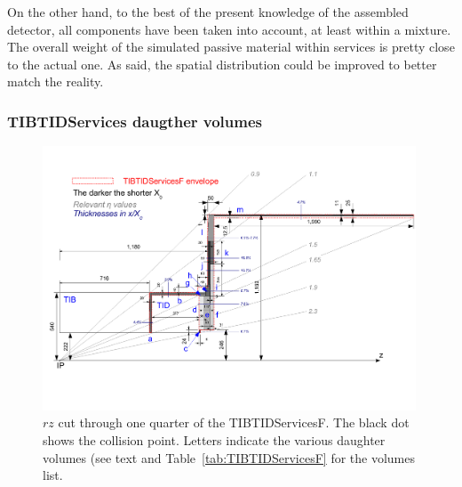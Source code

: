 On the other hand, to the best of the present knowledge of the assembled detector, all components have been taken into account, at least within a mixture. The overall weight of the simulated passive material within services is pretty close to the actual one. As said, the spatial distribution could be improved to better match the reality.

\subsubsection{TIBTIDServices daugther volumes}
%
\begin{figure}
\includegraphics*[width=0.99\textwidth]{fig/TIBTIDServicesF_draw.pdf}
\caption{$rz$ cut through one quarter of the TIBTIDServicesF. The black dot
shows the collision point. Letters indicate the various daughter volumes (see text and Table~\ref{tab:TIBTIDServicesF} for the volumes list.}
\label{fig:layout}
\end{figure}
%
%
